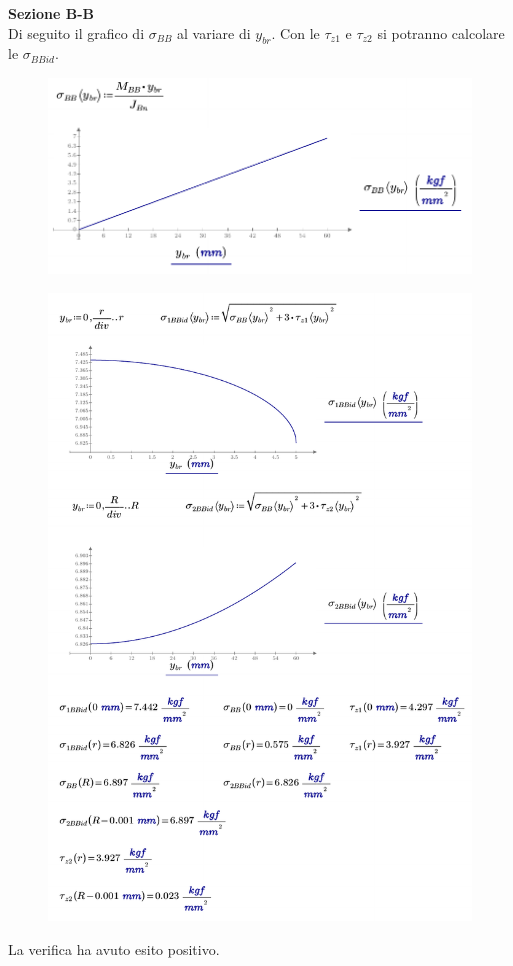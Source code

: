 \textbf{Sezione B-B}\\[1mm]
Di seguito il grafico di $\sigma_{BB}$ al variare di $y_{br}$. Con le $\tau_{z1}$ e $\tau_{z2}$ si potranno calcolare le $\sigma_{BBid}$.
\begin{figure}[H]
\centering
  \includegraphics[width=.68\textwidth]{imgs/MathAsse9_0}
\caption{}
\label{fig:MathAsse9_0}
\end{figure}
\begin{figure}[H]
\centering
  \includegraphics[width=.68\textwidth]{imgs/MathAsse9_1}
\caption{}
\label{fig:MathAsse9_1}
\end{figure}
La verifica ha avuto esito positivo.

